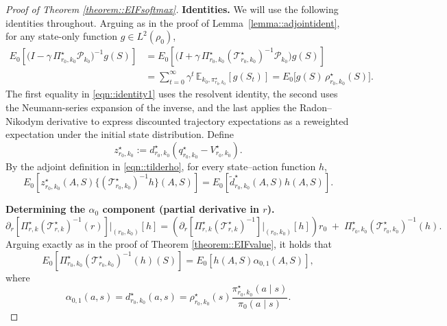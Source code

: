 \documentclass[11pt]{article}
\theoremstyle{plain}
\begin{document}
\begin{proof}[Proof of Theorem \ref{theorem::EIFsoftmax}]
 
 
 

\noindent \textbf{Identities.} We will use the following identities throughout. Arguing as in the proof of Lemma~\ref{lemma::adjointident}, for any state-only function $g\in L^2(\rho_0)$,
\begin{equation}
\label{eqn::identity1}
\begin{aligned}
E_0\!\left[\big(I-\gamma\,\Pi_{r_0,k_0}^\star \mathcal{P}_{k_0}\big)^{-1} g(S)\right]
&= E_0\!\left[\Big(I + \gamma\,\Pi_{r_0,k_0}^\star (\mathcal{T}_{r_0,k_0}^\star)^{-1}\mathcal{P}_{k_0}\Big) g(S)\right] \\
&= \sum_{t=0}^\infty \gamma^t\,\mathbb{E}_{k_0,\pi_{r_0,k_0}^\star}[g(S_t)]
= E_0\!\big[g(S)\,\rho_{r_0,k_0}^\star(S)\big].
\end{aligned}
\end{equation}
The first equality in \eqref{eqn::identity1} uses the resolvent identity,
the second uses the Neumann-series expansion of the inverse,
and the last applies the Radon--Nikodym derivative to express discounted
trajectory expectations as a reweighted expectation under the initial state distribution. 
Define
\[
z_{r_0,k_0}^\star
:=d_{r_0,k_0}^\star(q_{r_0,k_0}^\star-V_{r_0,k_0}^\star).
\]
By the adjoint definition in \eqref{eqn::tilderho}, for every state--action
function \(h\),
\begin{equation}
\label{eqn::identity2}
E_0\!\left[z_{r_0,k_0}^\star(A,S)
\{(\mathcal T_{r_0,k_0}^\star)^{-1}h\}(A,S)\right]
=E_0\!\left[\widetilde d_{r_0,k_0}^\star(A,S)h(A,S)\right].
\end{equation}

\noindent \textbf{Determining the $\alpha_0$ component (partial derivative in $r$).}
\[
\partial_r\!\left[\Pi_{r,k}^\star (\mathcal T_{r,k}^\star)^{-1}(r)\right]\Big|_{(r_0,k_0)}[h]
= \left(\partial_r\!\left[\Pi_{r,k}^\star (\mathcal T_{r,k}^\star)^{-1}\right]\Big|_{(r_0,k_0)}[h]\right)\!r_0
\;+\; \Pi_{r_0,k_0}^\star (\mathcal T_{r_0,k_0}^\star)^{-1}(h).
\]
Arguing exactly as in the proof of Theorem \ref{theorem::EIFvalue}, it holds that
\begin{equation}
    E_0[\Pi_{r_0,k_0}^\star (\mathcal T_{r_0,k_0}^\star)^{-1}(h)(S)] = E_0[h(A,S) \alpha_{0,1}(A,S)],\label{eqnproof::alpha01}
\end{equation}
where
$$\alpha_{0,1}(a,s) = d_{r_0,k_0}^{\star}(a,s) = \rho_{r_0,k_0}^{\star}(s) \frac{\pi_{r_0, k_0}^\star(a \mid s)}{\pi_0(a\mid s)}.$$



\end{proof}
\end{document}
